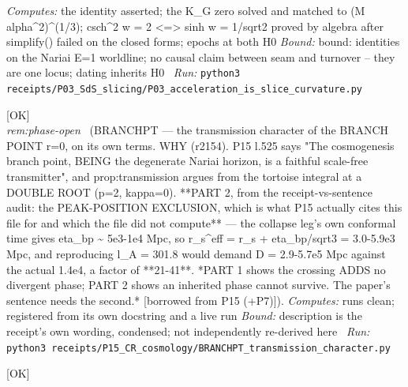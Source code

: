 \begin{description}
\emph{Computes:} the identity asserted; the K\_G zero solved and matched to (M alpha\textasciicircum{}2)\textasciicircum{}(1/3); csch\textasciicircum{}2 w = 2 <=> sinh w = 1/sqrt2 proved by algebra after simplify() failed on the closed forms; epochs at both H0
 \emph{Bound:} bound: identities on the Nariai E=1 worldline; no causal claim between seam and turnover -- they are one locus; dating inherits H0
\ \emph{Run:} \texttt{python3 receipts/P03\_SdS\_slicing/P03\_acceleration\_is\_slice\_curvature.py}
\item[\rcptlabel{BRANCHPT_transmission_character}{P15R42}\textbf{P15R42}\quad\texttt{BRANCHPT\_transmission\_character}]\hfill\textsf{[OK]}\\
\textit{rem:phase-open} \ (BRANCHPT --- the transmission character of the BRANCH POINT r=0, on its own terms. WHY (r2154). P15 l.525 says "The cosmogenesis branch point, BEING the degenerate Nariai horizon, is a faithful scale-free transmitter", and prop:transmission argues from the tortoise integral at a DOUBLE ROOT (p=2, kappa=0).  **PART 2, from the receipt-vs-sentence audit: the PEAK-POSITION EXCLUSION, which is what P15 actually cites this file for and which the file did not compute** --- the collapse leg's own conformal time gives eta\_bp \textasciitilde{} 5e3-1e4 Mpc, so r\_s\textasciicircum{}eff = r\_s + eta\_bp/sqrt3 = 3.0-5.9e3 Mpc, and reproducing l\_A = 301.8 would demand D = 2.9-5.7e5 Mpc against the actual 1.4e4, a factor of **21-41**. *PART 1 shows the crossing ADDS no divergent phase; PART 2 shows an inherited phase cannot survive. The paper's sentence needs the second.* [borrowed from P15 (+P7)]). 
\emph{Computes:} runs clean; registered from its own docstring and a live run
 \emph{Bound:} description is the receipt's own wording, condensed; not independently re-derived here
\ \emph{Run:} \texttt{python3 receipts/P15\_CR\_cosmology/BRANCHPT\_transmission\_character.py}
\item[\label{rcpt:H1_the_low_multipole_deficit_is_two_effects_and_the_ladder_imprint_dies_where_the_transfer_is_narrow}\textbf{}\quad\texttt{H1\_the\_low\_multipole\_deficit\_is\_two\_effects\_and\_the\_ladder\_imprint\_dies\_where\_the\_transfer\_is\_narrow}]\hfill\textsf{[OK]}\\

\end{description}
